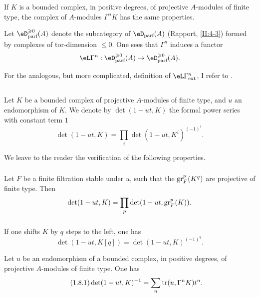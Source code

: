 If $K$ is a bounded complex, in positive degrees, of projective
$A$-modules of finite type, the complex of $A$-modules $\Gamma^n K$ has the same
properties.

Let $\eD_\text{parf}^{\geqslant 0}(A)$ denote the subcategory of
$\eD_\text{parf}(A)$ (Rapport, \ref{II:4-3}) formed by complexes of
tor-dimension $\leqslant 0$. One sees that $\Gamma^n$ induces a functor
\[
  \eL\Gamma^n : \eD_\text{parf}^{\geqslant 0}(A) \to \eD_\text{parf}^{\geqslant 0}(A) \text{.}
\]

For the analogous, but more complicated, definition of
$\eL\Gamma_\text{ext}^n$, I refer to \cite[XVII 5.5.14]{sga4}.




\subsection{}\label{III:1-7}

Let $K$ be a bounded complex of projective $A$-modules of finite type, and $u$
an endomorphism of $K$. We denote by $\det(1-u t,K)$ the formal power series with
constant term $1$
\[
  \det(1-u t,K) = \prod_i \det(1-u t,K^i)^{(-1)^i} \text{.}
\]

We leave to the reader the verification of the following properties.


\subsubsection{}\label{III:1-7-1}

Let $F$ be a finite filtration stable under $u$, such that the $\operatorname{gr}_F^p(K^q)$
are projective of finite type. Then
\[
  \det(1-u t,K) = \prod_p \det(1-u t,\operatorname{gr}_F^p(K)) \text{.}
\]


\subsubsection{}\label{III:1-7-2}

If one shifts $K$ by $q$ steps to the left, one has
\[
  \det(1-u t,K[q]) = \det(1-u t,K)^{(-1)^q} \text{.}
\]




\begin{proposition_}\label{III:1-8}
Let $u$ be an endomorphism of a bounded complex, in positive degrees, of
projective $A$-modules of finite type. One has \
\begin{equation*}\tag{1.8.1}\label{III:eq:1-8-1}
  \det(1-u t,K)^{-1} = \sum_n \operatorname{tr}(u,\Gamma^n K) t^n \text{.}
\end{equation*}
\end{proposition_}

